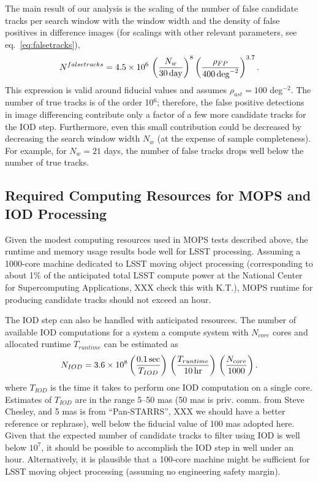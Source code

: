 The main result of our analysis is the scaling of the number of false candidate tracks per search window 
with the window width and the density of false positives in difference images (for scalings with other relevant 
parameters, see eq.~\ref{eq:falsetracks}), 
\begin{equation}  
\label{eq:falsetracks2}
   N^{falsetracks} = 4.5 \times 10^6 \, \left( {N_w \over 30 \, {\rm day} } \right)^{8} \left( {\rho_{FP} \over 400 \, {\rm deg}^{-2} }\right)^{3.7}. 
\end{equation} 
This expression is valid around fiducial values and assumes $\rho_{ast}=100$ deg$^{-2}$.
The number of true tracks is of the order 10$^6$; therefore, the false positive detections
in image differencing contribute only a factor of a few more candidate tracks for the IOD step. 
Furthermore, even this small contribution could be decreased by decreasing the search window
width $N_w$ (at the expense of sample completeness). For example, for $N_w=21$ days,
the number of false tracks drops well below the number of true tracks.


\subsection{Required Computing Resources for MOPS and IOD Processing} 

Given the modest computing resources used in MOPS tests described above, the runtime and memory 
usage results bode well for LSST processing. Assuming a 1000-core machine dedicated to LSST moving 
object processing (corresponding to about 1\% of the anticipated total LSST compute power at the 
National Center for Supercomputing Applications, XXX check this with K.T.), MOPS runtime for 
producing candidate tracks should not exceed an hour. 

The IOD step can also be handled with anticipated resources. The number of available IOD computations 
for a system a compute system with $N_{core}$ cores and allocated runtime $T_{runtime}$ can be estimated 
as 
\begin{equation}
  N_{IOD} = 3.6\times10^8 \left({ 0.1\,{\rm sec} \over T_{IOD}}\right) \,
                                         \left({ T_{runtime}  \over 10\,{\rm hr} }\right) \,
                                         \left({ N_{core}  \over 1000}\right).
\end{equation}
where $T_{IOD}$ is the time it takes to perform one IOD computation on a single core. Estimates
of $T_{IOD}$ are in the range 5--50 mas (50 mas is priv. comm. from Steve Chesley, and 5 mas is
from ``Pan-STARRS'', XXX we should have a better reference or rephrase), well below the fiducial
value of 100 mas adopted here. Given that the expected number of candidate tracks to filter using
IOD is well below $10^7$, it should be possible to accomplish the IOD step in well under an hour. 
Alternatively, it is plausible that a 100-core machine might be sufficient for LSST moving object 
processing (assuming no engineering safety margin). 

